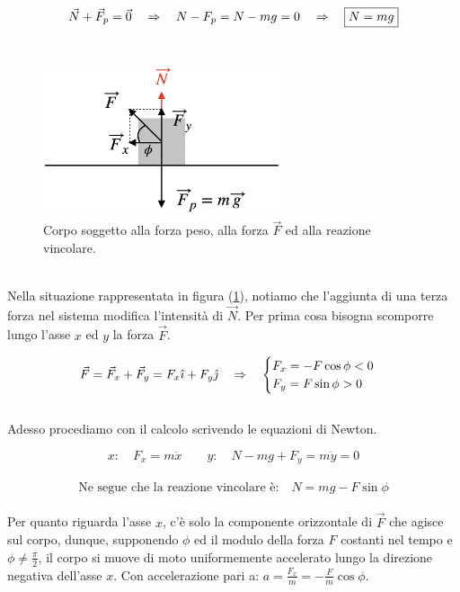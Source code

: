 \begin{equation}
    \vec N + \vec F_p = \vec 0 \quad\Rightarrow\quad N - F_p = N - mg = 0 \quad\Rightarrow\quad \boxed{N = mg}
\label{eq:forces:vincolar_reaction}
\end{equation}
\\
\begin{figure}[htbp]
\center
        \includegraphics[width=7cm]{images/NPF.png}
        \caption{Corpo soggetto alla forza peso, alla forza $\vec F$ ed alla
        reazione vincolare.}
        \label{fig:vincolar_reaction_2}
\end{figure}
\\
Nella situazione rappresentata in figura (\ref{fig:vincolar_reaction_2}),
notiamo che l'aggiunta di una terza forza nel sistema modifica l'intensità
di $\vec N$. Per prima cosa bisogna scomporre lungo l'asse $x$ ed $y$ la
forza $\vec F$.

\begin{equation}
    \vec F = \vec F_x + \vec F_y = F_x\hat\imath + F_y\hat\jmath\quad\Rightarrow\quad 
    \begin{cases}
        F_x = -F\cos\phi <0\\
        F_y = F\sin\phi>0
    \end{cases}
\end{equation}
\\
Adesso procediamo con il calcolo scrivendo le equazioni di Newton.

\begin{equation}
    x:\quad F_x = m\ddot x\qquad
    y:\quad N-mg+F_y = m\ddot y = 0
\end{equation}
\\
\begin{equation}
    \mbox{Ne segue che la reazione vincolare è:}\quad \boxed{N = mg -F\sin\phi}
\end{equation}
\\
Per quanto riguarda l'asse $x$, c'è solo la componente orizzontale di
$\vec F$ che agisce sul corpo, dunque, supponendo $\phi$ ed il modulo della
forza $F$ costanti nel tempo e $\phi\ne\frac\pi2$, il corpo si muove di moto
uniformemente accelerato lungo la direzione negativa dell'asse $x$.
Con accelerazione pari a: $a = \frac{F_x}{m} = -\frac Fm\cos\phi$.

